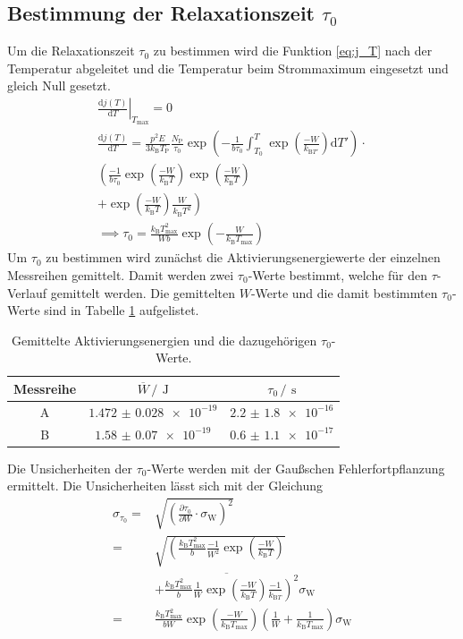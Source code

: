 \subsection{Bestimmung der Relaxationszeit \texorpdfstring{$\tau_{0}$}{T1}}
Um die Relaxationszeit $\tau_{0}$ zu bestimmen wird die Funktion \eqref{eq:j_T} nach der Temperatur abgeleitet und 
die Temperatur beim Strommaximum eingesetzt und gleich Null gesetzt.
\begin{gather*}
    \left.\frac{\text{d}j(T)}{\text{d}T}\right|_{T_{\text{max}}}=0\\
    \frac{\text{d}j(T)}{\text{d}T} = \frac{p^2E}{3k_{\text{B}}T_{\text{P}}}\frac{N_{\text{P}}}{\tau_0}
    \exp{\left(-\frac{1}{b\tau_0} \int^T_{T_0} \exp{\left(\frac{-W}{k_{\text{B}T'}}\right)}\text{d}T'\right)}\cdot\\
    \left(\frac{-1}{b\tau_0} \exp{\left(\frac{-W}{k_\text{B}T}\right)}\exp{\left(\frac{-W}{k_\text{B}T}\right)}\right.\\
    \left.+\exp{\left(\frac{-W}{k_\text{B}T}\right)}\frac{W}{k_{\text{B}}T^2}\right)\\
    \implies \tau_0 = \frac{k_{\text{B}}T_{\text{max}}^2}{Wb}\exp{\left(-\frac{W}{k_{\text{B}}T_{\text{max}}}\right)}
\end{gather*}
Um $\tau_0$ zu bestimmen wird zunächst die Aktivierungsenergiewerte der einzelnen Messreihen gemittelt. Damit 
werden zwei $\tau_0$-Werte bestimmt, welche für den $\tau$-Verlauf gemittelt werden. Die gemittelten $W$-Werte und die 
damit bestimmten $\tau_0$-Werte sind in Tabelle \ref{tab:Mittelwerte} aufgelistet.
\FloatBarrier
\begin{table}
    \centering
    \caption{Gemittelte Aktivierungsenergien und die dazugehörigen $\tau_0$-Werte.}
    \label{tab:Mittelwerte}
    \begin{tabular}{c c c}
        \toprule
        Messreihe&$\overline{W} \,/\,\SI{}{\joule}$&$\tau_0 \,/\,\SI{}{\second}$\\
        \midrule
        A&$\num{1.472(28)e-19}$&$\num{2.2(18)e-16}$\\
        B&$\num{1.58(7)e-19}$&$\num{0.6(11)e-17}$\\
        \bottomrule
    \end{tabular}
\end{table}
\FloatBarrier
Die Unsicherheiten der $\tau_0$-Werte werden mit der Gaußschen Fehlerfortpflanzung ermittelt.
Die Unsicherheiten lässt sich mit der Gleichung 
\begin{align*}
    \sigma_{\tau_0} =& \sqrt{\left(\frac{\partial \tau_0}{\partial W}\cdot \sigma_{\text{W}}\right)^2}\\
    =&\sqrt{\left(\frac{k_{\text{B}}T_{\text{max}}^2}{b} \frac{-1}{W^2}\exp{\left(\frac{-W}{k_{\text{B}} T}\right)}\right.}\\ &\overline{\left.+ \frac{k_{\text{B}}T_{\text{max}}^2}{b} \frac{1}{W} \exp{\left(\frac{-W}{k_{\text{B}} T}\right)} \frac{-1}{k_{\text{B}T}} \right)^2}\sigma_{\text{W}}\\
    =&\frac{k_{\text{B}}T_{\text{max}}^2}{bW}\exp{\left(\frac{-W}{k_{\text{B}} T_{\text{max}}}\right)}\left(\frac{1}{W}+ \frac{1}{k_{\text{B}}T_{\text{max}}}\right)\sigma_{\text{W}}
\end{align*}

